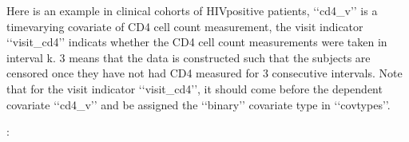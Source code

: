\documentclass[letterpaper,10pt,english]{sphinxmanual}
\begin{document}
\sphinxAtStartPar
Here is an example in clinical cohorts of HIV\sphinxhyphen{}positive patients, ‘‘cd4\_v’’ is a time\sphinxhyphen{}varying covariate of CD4 cell count measurement,
the visit indicator ‘‘visit\_cd4’’ indicats whether the CD4 cell count measurements were taken in interval k.
3 means that the data is constructed such that the subjects are censored once they have not had CD4 measured for 3 consecutive intervals.
Note that for the visit indicator ‘‘visit\_cd4’’, it should come before the dependent covariate ‘‘cd4\_v’’ and be assigned
the ‘‘binary’’ covariate type in ‘‘covtypes’’.

\sphinxAtStartPar
{}:

\begin{sphinxVerbatim}[commandchars=\\\{\}]
 
   
   
   

  
  
  


\end{sphinxVerbatim}
\end{document}
